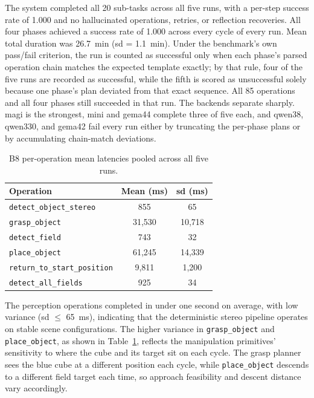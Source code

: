 The system completed all 20 sub-tasks across all five runs, with a per-step success rate of 1.000 and no hallucinated operations, retries, or reflection recoveries. All four phases achieved a success rate of 1.000 across every cycle of every run. Mean total duration was 26.7~min (\gls{sd} = 1.1~min). Under the benchmark’s own pass/fail criterion, the run is counted as successful only when each phase’s parsed operation chain matches the expected template exactly; by that rule, four of the five runs are recorded as successful, while the fifth is scored as unsuccessful solely because one phase’s plan deviated from that exact sequence. All 85 operations and all four phases still succeeded in that run. The backends separate sharply. \gls{magi} is the strongest, \gls{mini} and \gls{gema44} complete three of five each, and \gls{qwen38}, \gls{qwen330}, and \gls{gema42} fail every run either by truncating the per-phase plans or by accumulating chain-match deviations.

\begin{table}[t]
	\centering
	\begin{tabular}{lcc}
		\hline
		\textbf{Operation}                   & \textbf{Mean (ms)} & \textbf{\gls{sd} (ms)} \\
		\hline
		\texttt{detect\_object\_stereo}      & 855                & 65                     \\
		\texttt{grasp\_object}               & 31{,}530           & 10{,}718               \\
		\texttt{detect\_field}               & 743                & 32                     \\
		\texttt{place\_object}               & 61{,}245           & 14{,}339               \\
		\texttt{return\_to\_start\_position} & 9{,}811            & 1{,}200                \\
		\texttt{detect\_all\_fields}         & 925                & 34                     \\
		\hline
	\end{tabular}
	\caption{B8 per-operation mean latencies pooled across all five runs.}
	\label{tab:b8-latency}
\end{table}

The perception operations completed in under one second on average, with low variance (\gls{sd} $\le$ 65~ms), indicating that the deterministic stereo pipeline operates on stable scene configurations. The higher variance in \texttt{grasp\_object} and \texttt{place\_object}, as shown in Table~\ref{tab:b8-latency}, reflects the manipulation primitives’ sensitivity to where the cube and its target sit on each cycle. The grasp planner sees the blue cube at a different position each cycle, while \texttt{place\_object} descends to a different field target each time, so approach feasibility and descent distance vary accordingly.

